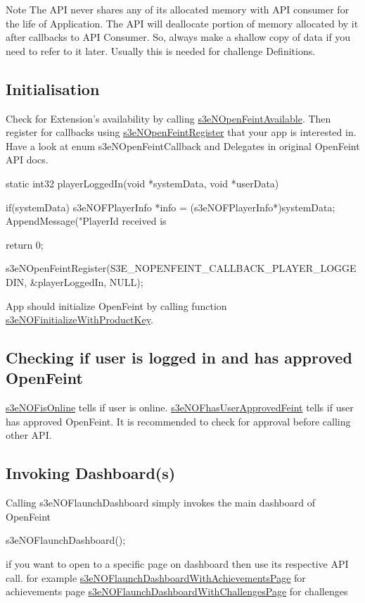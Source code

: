 \begin{DoxyNote}{Note}
The API never shares any of its allocated memory with API consumer for the life of Application. The API will deallocate portion of memory allocated by it after callbacks to API Consumer. So, always make a shallow copy of data if you need to refer to it later. Usually this is needed for challenge Definitions.
\end{DoxyNote}
\hypertarget{index_sec_4_1}{}\subsection{Initialisation}\label{index_sec_4_1}
Check for Extension's availability by calling \hyperlink{group___n_open_feint_api_group_ga6b912a16b413186f3387e8e9a95bcb21}{s3eNOpenFeintAvailable}. Then register for callbacks using \hyperlink{group___n_open_feint_api_group_ga15c3278f021ef1cdbc4f2b522444cc90}{s3eNOpenFeintRegister} that your app is interested in. Have a look at enum s3eNOpenFeintCallback and Delegates in original OpenFeint API docs. 
\begin{DoxyCode}
 static int32 playerLoggedIn(void *systemData, void *userData) 
 {
        if(systemData)
        {
                s3eNOFPlayerInfo *info = (s3eNOFPlayerInfo*)systemData;
                AppendMessage("PlayerId received is %
        }
        
        return 0;
 }
 
 s3eNOpenFeintRegister(S3E_NOPENFEINT_CALLBACK_PLAYER_LOGGEDIN, &playerLoggedIn, 
      NULL);
\end{DoxyCode}


App should initialize OpenFeint by calling function \hyperlink{group___n_open_feint_api_group_gab565578b04e0056a8ce477a9b848a94c}{s3eNOFinitializeWithProductKey}.\hypertarget{index_sec_4_2}{}\subsection{Checking if user is logged in and has approved OpenFeint}\label{index_sec_4_2}
\hyperlink{group___n_open_feint_api_group_ga90b0d5b1df4a437f8c337a61ae7c4678}{s3eNOFisOnline} tells if user is online. \hyperlink{group___n_open_feint_api_group_gaffce9d737cb62d66c7cf64873b1c2aee}{s3eNOFhasUserApprovedFeint} tells if user has approved OpenFeint. It is recommended to check for approval before calling other API.\hypertarget{index_sec_4_3}{}\subsection{Invoking Dashboard(s)}\label{index_sec_4_3}
Calling s3eNOFlaunchDashboard simply invokes the main dashboard of OpenFeint 
\begin{DoxyCode}
                s3eNOFlaunchDashboard();
\end{DoxyCode}
 if you want to open to a specific page on dashboard then use its respective API call. for example \hyperlink{group___n_open_feint_api_group_ga10d29137246b18a6b0aa0f14190eafc8}{s3eNOFlaunchDashboardWithAchievementsPage} for achievements page \hyperlink{group___n_open_feint_api_group_ga298064bb113bc28f0f11dfa88f261ffe}{s3eNOFlaunchDashboardWithChallengesPage} for challenges

